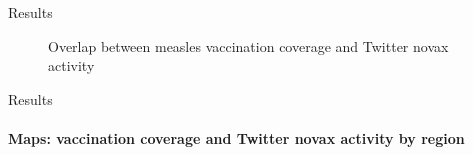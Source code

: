 \documentclass[9pt]{beamer}
\begin{document}
\begin{frame}{Results}
\begin{figure}
\begin{minipage}[]{0.48\linewidth}
	\end{minipage} 
	\caption{Overlap between measles vaccination coverage and Twitter novax activity}
	\end{figure}
	\end{frame}
	
	\begin{frame}{Results}
\framesubtitle{Maps: vaccination coverage and Twitter novax activity by region}

\begin{figure}
	\begin{minipage}[c]{0.48\linewidth}
	\centering
	\end{minipage} 
	\begin{minipage}[c]{0.48\linewidth}
	\centering

\end{minipage}
\end{figure}
\end{frame}
\end{document}
